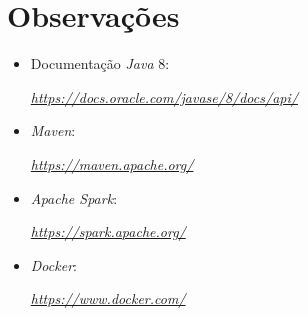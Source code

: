 \documentclass[a4paper]{report}
\begin{document}
\chapter{Observações} \label{ch:Observations}
\begin{itemize}
    \item Documentação \textit{Java} 8:
    \par \textit{\url{https://docs.oracle.com/javase/8/docs/api/}}
    \item \textit{Maven}:
    \par \textit{\url{https://maven.apache.org/}}
    \item \textit{Apache Spark}:
    \par \textit{\url{https://spark.apache.org/}}
    \item \textit{Docker}:
    \par \textit{\url{https://www.docker.com/}}
\end{itemize}
\end{document}
